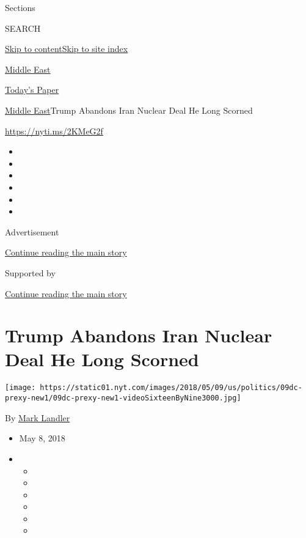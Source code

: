 Sections

SEARCH

\protect\hyperlink{site-content}{Skip to
content}\protect\hyperlink{site-index}{Skip to site index}

\href{https://www.nytimes.com/section/world/middleeast}{Middle East}

\href{https://myaccount.nytimes.com/auth/login?response_type=cookie\&client_id=vi}{}

\href{https://www.nytimes.com/section/todayspaper}{Today's Paper}

\href{/section/world/middleeast}{Middle East}\textbar{}Trump Abandons
Iran Nuclear Deal He Long Scorned

\url{https://nyti.ms/2KMeG2f}

\begin{itemize}
\item
\item
\item
\item
\item
\item
\end{itemize}

Advertisement

\protect\hyperlink{after-top}{Continue reading the main story}

Supported by

\protect\hyperlink{after-sponsor}{Continue reading the main story}

\hypertarget{trump-abandons-iran-nuclear-deal-he-long-scorned}{%
\section{Trump Abandons Iran Nuclear Deal He Long
Scorned}\label{trump-abandons-iran-nuclear-deal-he-long-scorned}}

\texttt{[image: https://static01.nyt.com/images/2018/05/09/us/politics/09dc-prexy-new1/09dc-prexy-new1-videoSixteenByNine3000.jpg]}

By \href{https://www.nytimes.com/by/mark-landler}{Mark Landler}

\begin{itemize}
\item
  May 8, 2018
\item
  \begin{itemize}
  \item
  \item
  \item
  \item
  \item
  \item
  \end{itemize}
\end{itemize}


